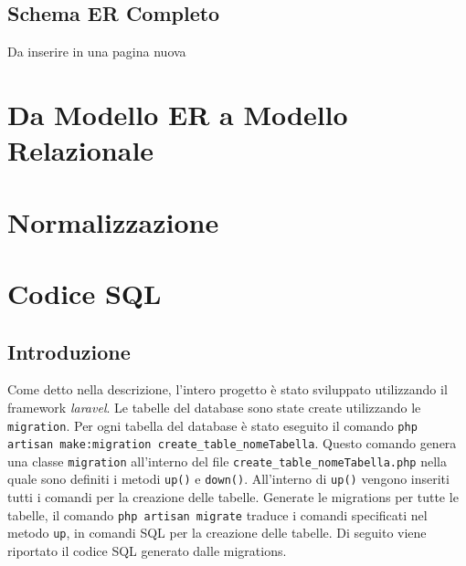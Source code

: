 \documentclass[paper=a4, fontsize=11pt,x11names]{report}
\begin{document}

\clearpage
\section{Schema ER Completo}
Da inserire in una pagina nuova

\chapter{Da Modello ER a Modello Relazionale}

\chapter{Normalizzazione}

\chapter{Codice SQL}
\section{Introduzione}
Come detto nella descrizione, l'intero progetto è stato sviluppato utilizzando il framework \textit{laravel}. Le tabelle del database sono state create utilizzando le \texttt{migration}. Per ogni tabella del database è stato eseguito il comando \texttt{php artisan make:migration create\_table\_nomeTabella}. Questo comando genera una classe \texttt{migration} all'interno del file \texttt{create\_table\_nomeTabella.php} nella quale sono definiti i metodi \texttt{up()} e \texttt{down()}. All'interno di \texttt{up()} vengono inseriti tutti i comandi per la creazione delle tabelle. Generate le migrations per tutte le tabelle, il comando \texttt{php artisan migrate} traduce i comandi specificati nel metodo \texttt{up}, in comandi SQL per la creazione delle tabelle. Di seguito viene riportato il codice SQL generato dalle migrations.
\end{document}
